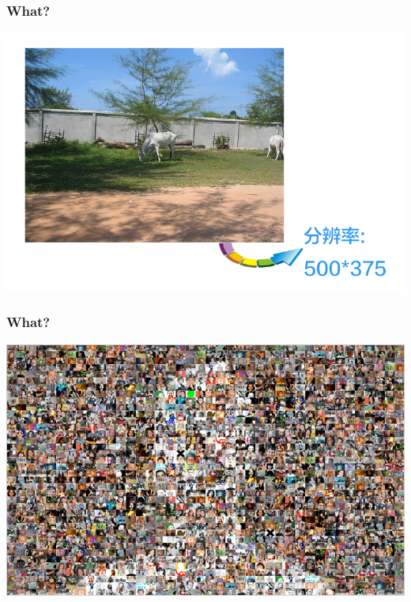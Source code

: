 \documentclass[notheorems,serif,table,compress]{beamer}  %
\begin{document}
  
\begin{frame}
  \frametitle{What?}
  \begin{center}
  \includegraphics[width=0.85\linewidth]{tuxiang.png}
  \end{center}
  
  \pause
\end{frame}

  
\begin{frame}
\frametitle{What?}
  \begin{center}
  \includegraphics[width=1\linewidth]{people}
  \end{center}
\end{frame}
\end{document}
